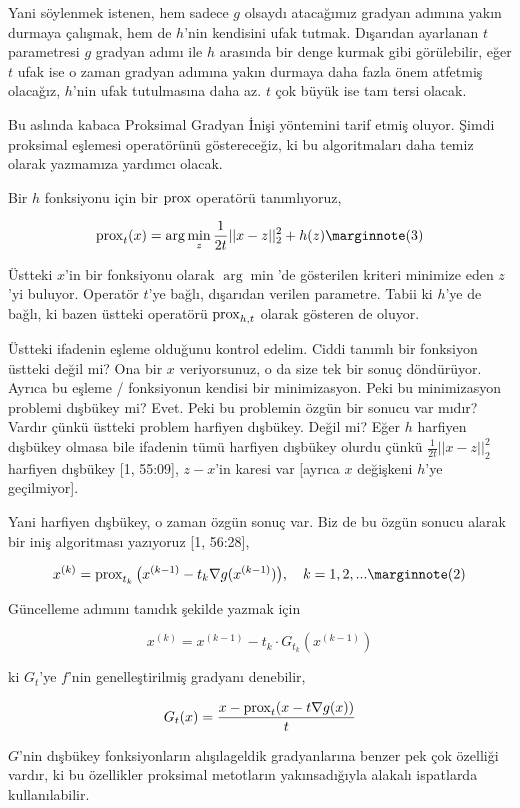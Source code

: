 \documentclass[12pt,fleqn]{article}\usepackage{../../common}
\begin{document}
Yani söylenmek istenen, hem sadece $g$ olsaydı atacağımız gradyan adımına
yakın durmaya çalışmak, hem de $h$'nin kendisini ufak tutmak. Dışarıdan
ayarlanan $t$ parametresi $g$ gradyan adımı ile $h$ arasında bir denge
kurmak gibi görülebilir, eğer $t$ ufak ise o zaman gradyan adımına yakın
durmaya daha fazla önem atfetmiş olacağız, $h$'nin ufak tutulmasına daha
az. $t$ çok büyük ise tam tersi olacak. 

Bu aslında kabaca Proksimal Gradyan İnişi yöntemini tarif etmiş
oluyor. Şimdi proksimal eşlemesi operatörünü göstereceğiz, ki bu
algoritmaları daha temiz olarak yazmamıza yardımcı olacak. 

Bir $h$ fonksiyonu için bir $\operatorname{prox}$ operatörü tanımlıyoruz, 

$$
\prox_{t} (x) = \arg\min_z \frac{1}{2t} ||x-z||_2^2 + h(z)
\mlabel{3}
$$

Üstteki $x$'in bir fonksiyonu olarak $\arg\min$'de gösterilen kriteri
minimize eden $z$'yi buluyor. Operatör $t$'ye bağlı, dışarıdan verilen
parametre. Tabii ki $h$'ye de bağlı, ki bazen üstteki operatörü
$\operatorname{prox}_{h,t}$ olarak gösteren de oluyor.

Üstteki ifadenin eşleme olduğunu kontrol edelim. Ciddi tanımlı bir
fonksiyon üstteki değil mi? Ona bir $x$ veriyorsunuz, o da size tek bir
sonuç döndürüyor. Ayrıca bu eşleme / fonksiyonun kendisi bir
minimizasyon. Peki bu minimizasyon problemi dışbükey mi? Evet. Peki bu
problemin özgün bir sonucu var mıdır? Vardır çünkü üstteki problem harfiyen
dışbükey. Değil mi? Eğer $h$ harfiyen dışbükey olmasa bile ifadenin tümü
harfiyen dışbükey olurdu çünkü $\frac{1}{2t} ||x-z||_2^2 $ harfiyen
dışbükey [1, 55:09], $z-x$'in karesi var [ayrıca $x$ değişkeni $h$'ye
geçilmiyor].

Yani harfiyen dışbükey, o zaman özgün sonuç var. Biz de bu özgün sonucu
alarak bir iniş algoritması yazıyoruz [1, 56:28], 

$$
x^{(k)} = \prox_{t_k} \big( 
x^{(k-1)} - t_k \nabla g(x^{(k-1)})
\big), \quad k=1,2,...
\mlabel{2}
$$

Güncelleme adımını tanıdık şekilde yazmak için 

$$
x^{(k)} = x^{(k-1)} - t_k \cdot G_{t_k} (x^{(k-1)})
$$

ki $G_t$'ye $f$'nin genelleştirilmiş gradyanı denebilir,

$$
G_t(x) = \frac{x - \operatorname{prox}_{t}(x - t \nabla g(x))}{t}
$$

$G$'nin dışbükey fonksiyonların alışılageldik gradyanlarına benzer pek çok
özelliği vardır, ki bu özellikler proksimal metotların yakınsadığıyla
alakalı ispatlarda kullanılabilir.
\end{document}
